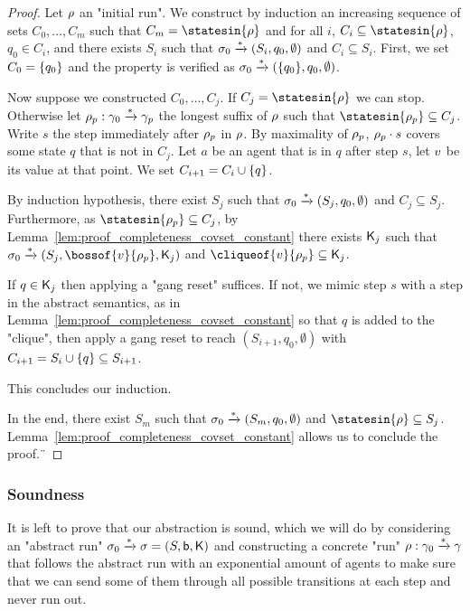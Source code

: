 \begin{proof}
	Let $\rho$ an "initial run".
	We construct by induction an increasing sequence of sets $C_0, \ldots, C_m$ such that $C_m = \statesin{\run}$ and for all $i$, $C_i \subseteq \statesin{\run}$, $q_0 \in C_i$, and there exists $S_i$ such that $\sigma_0 \xrightarrow{*} (S_i, q_0, \emptyset)$ and $C_i \subseteq S_i$. 
	First, we set $C_0 = \{q_0\}$ and the property is verified as $\sigma_0 \xrightarrow{*} (\{q_0\}, q_0, \emptyset)$.
	
	Now suppose we constructed $C_0, \ldots, C_j$. If $C_j = \statesin{\run}$ we can stop. Otherwise let $\rho_p: \gamma_0 \xrightarrow{*}\gamma_p$ the longest suffix of $\rho$ such that  $\statesin{\run_p} \subseteq C_j$. Write $s$ the step immediately after $\rho_p$ in $\rho$. By maximality of $\rho_p$, $\rho_p \cdot s$ covers some state $q$ that is not in $C_j$. Let $a$ be an agent that is in $q$ after step $s$, let $v$ be its value at that point. We set $C_{i+1} = C_i \cup \{q\}$.
	
	By induction hypothesis, there exist $S_{j}$ such that $\sigma_0 \xrightarrow{*} (S_{j}, q_0, \emptyset)$ and $C_j \subseteq S_{j}$. Furthermore, as $\statesin{\run_p} \subseteq C_j$, by Lemma~\ref{lem:proof_completeness_covset_constant} there exists $\mathsf{K}_j$ such that $\aconfiginit \step{*} (S_{j}, \bossof{\aval}{\run_p}, \clique_j)$ and $\cliqueof{\aval}{\run_p} \subseteq \clique_j$.
	
	If $q \in \mathsf{K}_j$ then applying a "gang reset" suffices. If not, we mimic step $s$ with a step in the abstract semantics, as in Lemma~\ref{lem:proof_completeness_covset_constant} so that $q$ is added to the "clique", then apply a gang reset to reach $(S_{i+1}, q_0, \emptyset)$ with $C_{i+1} = S_i \cup \{q\} \subseteq S_{i+1}$. 
	
	This concludes our induction.
	
	In the end, there exist $S_m$ such that $\sigma_0 \xrightarrow{*} (S_{m}, q_0, \emptyset)$ and $\statesin{\run} \subseteq S_{j}$. Lemma~\ref{lem:proof_completeness_covset_constant} allows us to conclude the proof.¨
\end{proof}


\subsubsection{Soundness}
\label{sec:one-soundness}

It is left to prove that our abstraction is sound, which we will do by considering an "abstract run" $\sigma_0 \xrightarrow{\ast} \sigma = (S, \mathsf{b}, \mathsf{K})$ and constructing a concrete "run" $\rho : \gamma_0 \xrightarrow{\ast} \gamma $ that follows the abstract run with an exponential amount of agents to make sure that we can send some of them through all possible transitions at each step and never run out.


